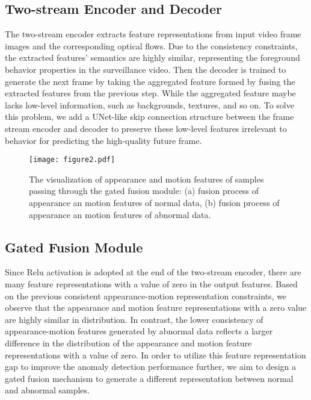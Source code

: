 \documentclass[sigconf]{acmart}
\begin{document}
\subsection{Two-stream Encoder and Decoder}
The two-stream encoder extracts feature representations from input video frame images and the corresponding optical flows. Due to the consistency constraints, the extracted features’ semantics are highly similar, representing the foreground behavior properties in the surveillance video. Then the decoder is trained to generate the next frame by taking the aggregated feature formed by fusing the extracted features from the previous step. While the aggregated feature maybe lacks low-level information, such as backgrounds, textures, and so on. To solve this problem, we add a UNet-like skip connection structure \cite{ronneberger2015u} between the frame stream encoder and decoder to preserve these low-level features irrelevant to behavior for predicting the high-quality future frame.
\begin{figure}[hb]
	\centering
	\texttt{[image: figure2.pdf]}
	\caption{The visualization of appearance and motion features of samples passing through the gated fusion module: (a) fusion process of appearance an motion features of normal data, (b) fusion process of appearance an motion features of abnormal data.}
	\label{p3}
\end{figure}
\subsection{Gated Fusion Module}
Since Relu activation is adopted at the end of the two-stream encoder, there are many feature representations with a value of zero in the output features. Based on the previous consistent appearance-motion representation constraints, we observe that the appearance and motion feature representations with a zero value are highly similar in distribution. In contrast, the lower consistency of appearance-motion features generated by abnormal data reflects a larger difference in the distribution of the appearance and motion feature representations with a value of zero. In order to utilize this feature representation gap to improve the anomaly detection performance further, we aim to design a gated fusion mechanism to generate a different representation between normal and abnormal samples.
\end{document}
